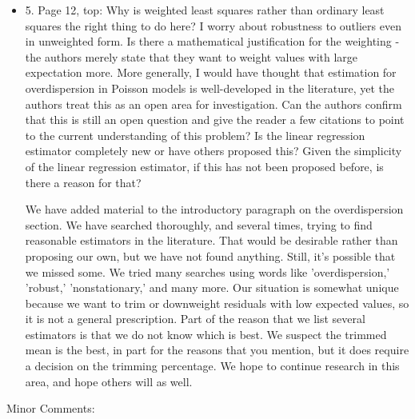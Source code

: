 \documentclass[12pt, titlepage]{article}
\begin{document}
\begin{itemize}
{\begin{itemize}
  \end{itemize}
}

 \dots

\item {\color{red!70!black} 5. Page 12, top: Why is weighted least squares rather than ordinary least squares the right thing to do here? I worry about robustness to outliers even in unweighted form. Is there a mathematical justification for the weighting - the authors merely state that they want to weight values with large expectation more. More generally, I would have thought that estimation for overdispersion in Poisson models is well-developed in the literature, yet the authors treat this as an open area for investigation. Can the authors confirm that this is still an open question and give the reader a few citations to point to the current understanding of this problem? Is the linear regression estimator completely new or have others proposed this? Given the simplicity of the linear regression estimator, if this has not been proposed before, is there a reason for that?}

  We have added material to the introductory paragraph on the overdispersion section.  We have searched thoroughly, and several times, trying to find reasonable estimators in the literature.  That would be desirable rather than proposing our own, but we have not found anything.  Still, it's possible that we missed some.  We tried many searches using words like 'overdispersion,' 'robust,' 'nonstationary,' and many more.  Our situation is somewhat unique because we want to trim or downweight residuals with low expected values, so it is not a general prescription.  Part of the reason that we list several estimators is that we do not know which is best.  We suspect the trimmed mean is the best, in part for the reasons that you mention, but it does require a decision on the trimming percentage.  We hope to continue research in this area, and hope others will as well.

\end{itemize}

\vspace{.5cm}
{\color{red!70!black} \noindent \Large Minor Comments:}
\end{document}
